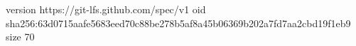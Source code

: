 version https://git-lfs.github.com/spec/v1
oid sha256:63d0715aafe5683eed70c88be278b5af8a45b06369b202a7fd7aa2cbd19f1eb9
size 70
